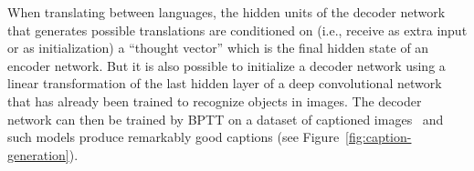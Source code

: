 \documentclass[10pts]{article}
\begin{document}
\begin{figure}[ht]
\end{figure}

When translating between languages, the hidden units of the decoder network
that generates possible translations are conditioned on (i.e., receive as extra
input or as initialization) a ``thought
vector'' which is the final hidden state of an encoder network.  But it is
also possible to initialize a decoder network using a linear transformation
of the last hidden layer of a deep convolutional network that has already
been trained to recognize objects in images. The decoder network can then
be trained by BPTT on a dataset of captioned
images~\citep{Kiros-et-al-ICML2014,Mao+al-arxiv2014,Donahue-et-al-arxiv2014,
              Vinyals-et-al-arxiv2014,
             Chen+Zitnick-arxiv2014,Karpathy+Li-arxiv2014,Venugopalan-et-al-arxiv2014} 
and such models produce remarkably good
captions (see Figure~\ref{fig:caption-generation}).
\end{document}
